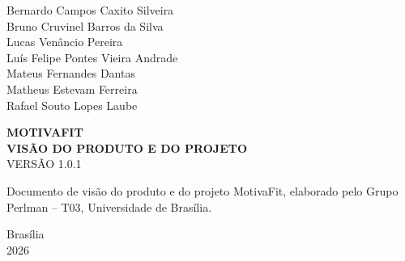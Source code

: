 \begin{center}
Bernardo Campos Caxito Silveira\\
Bruno Cruvinel Barros da Silva\\
Lucas Venâncio Pereira\\
Luís Felipe Pontes Vieira Andrade\\
Mateus Fernandes Dantas\\
Matheus Estevam Ferreira\\
Rafael Souto Lopes Laube

\vspace{2cm}
\textbf{MOTIVAFIT}\\[0.5cm]
\textbf{VISÃO DO PRODUTO E DO PROJETO}\\[0.5cm]
VERSÃO 1.0.1
\end{center}

\vspace{2cm}
\noindent\hspace*{0.5\textwidth}%
\begin{minipage}{0.5\textwidth}
Documento de visão do produto e do projeto MotivaFit, elaborado pelo
Grupo Perlman -- T03, Universidade de Brasília.
\end{minipage}

\vfill
\begin{center}
Brasília\\
2026
\end{center}
\clearpage
